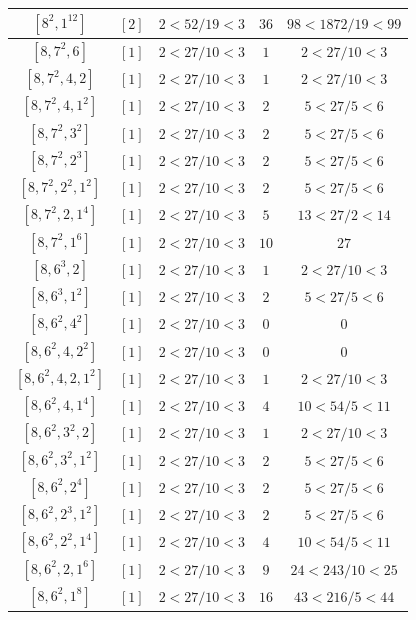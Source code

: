 \documentclass{article}%
\begin{document}
\begin{center}
\begin{longtable}{||c|c|c|c|c||}
$[8^{2}, 1^{12}]$ & $[2]$ & $2 < 52/19 < 3$ & $36$ & $98 < 1872/19 < 99$ \\ \hline 
$[8, 7^{2}, 6]$ & $[1]$ & $2 < 27/10 < 3$ & $1$ & $2 < 27/10 < 3$ \\ \hline 
$[8, 7^{2}, 4, 2]$ & $[1]$ & $2 < 27/10 < 3$ & $1$ & $2 < 27/10 < 3$ \\ \hline 
$[8, 7^{2}, 4, 1^{2}]$ & $[1]$ & $2 < 27/10 < 3$ & $2$ & $5 < 27/5 < 6$ \\ \hline 
$[8, 7^{2}, 3^{2}]$ & $[1]$ & $2 < 27/10 < 3$ & $2$ & $5 < 27/5 < 6$ \\ \hline 
$[8, 7^{2}, 2^{3}]$ & $[1]$ & $2 < 27/10 < 3$ & $2$ & $5 < 27/5 < 6$ \\ \hline 
$[8, 7^{2}, 2^{2}, 1^{2}]$ & $[1]$ & $2 < 27/10 < 3$ & $2$ & $5 < 27/5 < 6$ \\ \hline 
$[8, 7^{2}, 2, 1^{4}]$ & $[1]$ & $2 < 27/10 < 3$ & $5$ & $13 < 27/2 < 14$ \\ \hline 
$[8, 7^{2}, 1^{6}]$ & $[1]$ & $2 < 27/10 < 3$ & $10$ & $27$ \\ \hline 
$[8, 6^{3}, 2]$ & $[1]$ & $2 < 27/10 < 3$ & $1$ & $2 < 27/10 < 3$ \\ \hline 
$[8, 6^{3}, 1^{2}]$ & $[1]$ & $2 < 27/10 < 3$ & $2$ & $5 < 27/5 < 6$ \\ \hline 
$[8, 6^{2}, 4^{2}]$ & $[1]$ & $2 < 27/10 < 3$ & $0$ & $0$ \\ \hline 
$[8, 6^{2}, 4, 2^{2}]$ & $[1]$ & $2 < 27/10 < 3$ & $0$ & $0$ \\ \hline 
$[8, 6^{2}, 4, 2, 1^{2}]$ & $[1]$ & $2 < 27/10 < 3$ & $1$ & $2 < 27/10 < 3$ \\ \hline 
$[8, 6^{2}, 4, 1^{4}]$ & $[1]$ & $2 < 27/10 < 3$ & $4$ & $10 < 54/5 < 11$ \\ \hline 
$[8, 6^{2}, 3^{2}, 2]$ & $[1]$ & $2 < 27/10 < 3$ & $1$ & $2 < 27/10 < 3$ \\ \hline 
$[8, 6^{2}, 3^{2}, 1^{2}]$ & $[1]$ & $2 < 27/10 < 3$ & $2$ & $5 < 27/5 < 6$ \\ \hline 
$[8, 6^{2}, 2^{4}]$ & $[1]$ & $2 < 27/10 < 3$ & $2$ & $5 < 27/5 < 6$ \\ \hline 
$[8, 6^{2}, 2^{3}, 1^{2}]$ & $[1]$ & $2 < 27/10 < 3$ & $2$ & $5 < 27/5 < 6$ \\ \hline 
$[8, 6^{2}, 2^{2}, 1^{4}]$ & $[1]$ & $2 < 27/10 < 3$ & $4$ & $10 < 54/5 < 11$ \\ \hline 
$[8, 6^{2}, 2, 1^{6}]$ & $[1]$ & $2 < 27/10 < 3$ & $9$ & $24 < 243/10 < 25$ \\ \hline 
$[8, 6^{2}, 1^{8}]$ & $[1]$ & $2 < 27/10 < 3$ & $16$ & $43 < 216/5 < 44$ \\ \hline 

\end{longtable}
\end{center}
\end{document}
